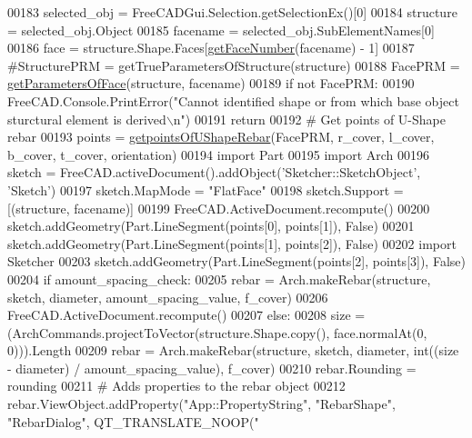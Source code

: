 \begin{DoxyCode}
00183         selected\_obj = FreeCADGui.Selection.getSelectionEx()[0]
00184         structure = selected\_obj.Object
00185         facename = selected\_obj.SubElementNames[0]
00186     face = structure.Shape.Faces[\hyperlink{namespaceRebarfunc_a3885b3b63e3a41508ac79bc7550cf301}{getFaceNumber}(facename) - 1]
00187     \textcolor{comment}{#StructurePRM = getTrueParametersOfStructure(structure)}
00188     FacePRM = \hyperlink{namespaceRebarfunc_a92122b3d7cedd3d47bb63380a5ac4d08}{getParametersOfFace}(structure, facename)
00189     \textcolor{keywordflow}{if} \textcolor{keywordflow}{not} FacePRM:
00190         FreeCAD.Console.PrintError(\textcolor{stringliteral}{"Cannot identified shape or from which base object sturctural element is
       derived\(\backslash\)n"})
00191         \textcolor{keywordflow}{return}
00192     \textcolor{comment}{# Get points of U-Shape rebar}
00193     points = \hyperlink{namespaceUShapeRebar_ac12ae9bce6b5211759f2fff4091b0221}{getpointsOfUShapeRebar}(FacePRM, r\_cover, l\_cover, b\_cover, t\_cover, 
      orientation)
00194     \textcolor{keyword}{import} Part
00195     \textcolor{keyword}{import} Arch
00196     sketch = FreeCAD.activeDocument().addObject(\textcolor{stringliteral}{'Sketcher::SketchObject'}, \textcolor{stringliteral}{'Sketch'})
00197     sketch.MapMode = \textcolor{stringliteral}{"FlatFace"}
00198     sketch.Support = [(structure, facename)]
00199     FreeCAD.ActiveDocument.recompute()
00200     sketch.addGeometry(Part.LineSegment(points[0], points[1]), \textcolor{keyword}{False})
00201     sketch.addGeometry(Part.LineSegment(points[1], points[2]), \textcolor{keyword}{False})
00202     \textcolor{keyword}{import} Sketcher
00203     sketch.addGeometry(Part.LineSegment(points[2], points[3]), \textcolor{keyword}{False})
00204     \textcolor{keywordflow}{if} amount\_spacing\_check:
00205         rebar = Arch.makeRebar(structure, sketch, diameter, amount\_spacing\_value, f\_cover)
00206         FreeCAD.ActiveDocument.recompute()
00207     \textcolor{keywordflow}{else}:
00208         size = (ArchCommands.projectToVector(structure.Shape.copy(), face.normalAt(0, 0))).Length
00209         rebar = Arch.makeRebar(structure, sketch, diameter, int((size - diameter) / amount\_spacing\_value), 
      f\_cover)
00210     rebar.Rounding = rounding
00211     \textcolor{comment}{# Adds properties to the rebar object}
00212     rebar.ViewObject.addProperty(\textcolor{stringliteral}{"App::PropertyString"}, \textcolor{stringliteral}{"RebarShape"}, \textcolor{stringliteral}{"RebarDialog"}, QT\_TRANSLATE\_NOOP(\textcolor{stringliteral}{"
}
\end{DoxyCode}
